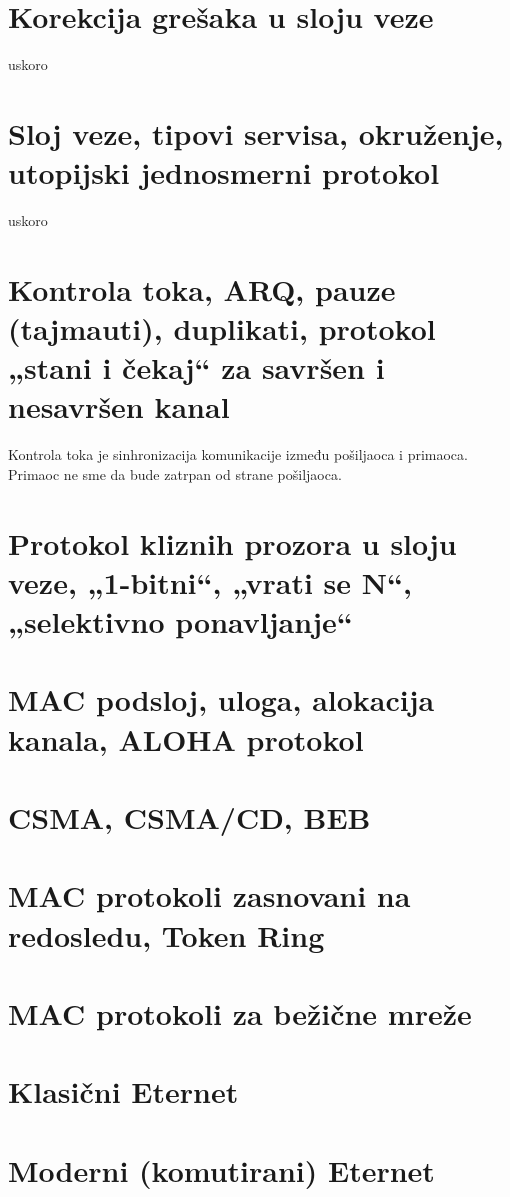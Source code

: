 \documentclass{article} %
\begin{document}
\section{Korekcija grešaka u sloju veze}
uskoro
\section{Sloj veze, tipovi servisa, okruženje, utopijski jednosmerni protokol}
uskoro
\section{Kontrola toka, ARQ, pauze (tajmauti), duplikati, protokol „stani i čekaj“ za savršen i nesavršen kanal}
Kontrola toka je sinhronizacija komunikacije između pošiljaoca i primaoca. Primaoc ne sme da bude zatrpan od strane pošiljaoca.
\section{Protokol kliznih prozora u sloju veze, „1-bitni“, „vrati se N“, „selektivno ponavljanje“}
\section{MAC podsloj, uloga, alokacija kanala, ALOHA protokol}
\section{CSMA, CSMA/CD, BEB}
\section{MAC protokoli zasnovani na redosledu, Token Ring}
\section{MAC protokoli za bežične mreže}
\section{Klasični Eternet}
\section{Moderni (komutirani) Eternet}
\end{document}
